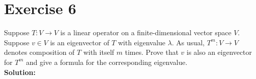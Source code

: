 \documentclass{article}
\begin{document}
\newpage

\section*{Exercise 6}
Suppose $T : V \rightarrow V$ is a linear operator on a finite-dimensional vector space $V$. Suppose $v \in V$ is an eigenvector of $T$ with eigenvalue $\lambda$. As usual, $T^m : V \rightarrow V$ denotes composition of $T$ with itself $m$ times. Prove that $v$ is also an eigenvector for $T^m$ and give a formula for the corresponding eigenvalue. \\

\textbf{Solution:} \\



\newpage
\end{document}
